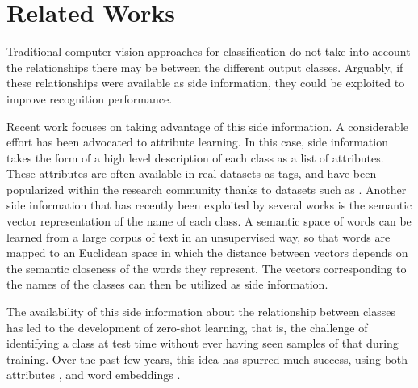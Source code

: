 \documentclass{bmvc2k}
\begin{document}
\section{\label{sec:Related-Works}Related Works}
Traditional computer vision approaches for classification do not take into
account the relationships there may be between the different output classes.
Arguably, if these relationships were available as side information, they could
be exploited to improve recognition performance.

Recent work focuses on taking advantage of this side information.
A considerable effort has been advocated to attribute learning. In this case,
side information takes the form of a high level description of each class as a list of attributes.
These attributes are often available in real datasets as tags, and have been
popularized within the research community thanks to datasets such as
\cite{Farhadi2009,lampert2009learning,patterson2012sun}.
Another side information that has recently been exploited by several works
\cite{socher2013zero_csm,frome2013devise,norouzi2013zero} is the semantic vector
representation of the name of each class. A semantic space of words can be
learned from a large corpus of text in an unsupervised way, so that
words are mapped to an Euclidean space in which the distance between vectors
depends on the semantic closeness of the words they represent. The vectors corresponding to the 
names of the classes can then be utilized as side information.

The availability of this side information about the relationship between classes
has led to the development of zero-shot learning, that is, the challenge of
identifying a class at test time without ever having seen samples of that during
training. Over the past few years, this idea has spurred much success,
using both attributes
\cite{pala_geoff2009zsl,akata2013label,romera2015embarrassingly,lampert2009learning},
and word embeddings \cite{norouzi2013zero,socher2013zero_csm}.
\end{document}
